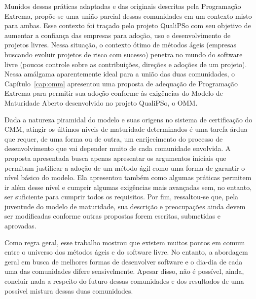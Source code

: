 Munidos dessas práticas adaptadas e das originais descritas pela
Programação Extrema, propõe-se uma união parcial dessas comunidades em
um contexto misto para ambas. Esse contexto foi traçado pelo projeto
QualiPSo com seu objetivo de aumentar a confiança das empresas para
adoção, uso e desenvolvimento de projetos livres.  Nessa situação, o
contexto ótimo de métodos ágeis (empresas buscando evoluir projetos de
risco com sucesso) penetra no mundo do software livre (poucos controle
sobre as contribuições, direções e adoções de um projeto). Nessa
amálgama aparentemente ideal para a união das duas comunidades, o
Capítulo~\ref{cap:omm} apresentou uma proposta de adequação de
Programação Extrema para permitir sua adoção conforme às exigências do
Modelo de Maturidade Aberto desenvolvido no projeto QualiPSo, o OMM.

Dada a natureza piramidal do modelo e suas origens no sistema de
certificação do CMM, atingir os últimos níveis de maturidade
determinados é uma tarefa árdua que requer, de uma forma ou de outra,
um enrijecimento do processo de desenvolvimento que vai depender muito
de cada comunidade envolvida. A proposta apresentada busca apenas
apresentar os argumentos iniciais que permitam justificar a adoção de
um método ágil como uma forma de garantir o nível básico do
modelo. Ela apresentou também como algumas práticas permitem ir além
desse nível e cumprir algumas exigências mais avançadas sem, no
entanto, ser suficiente para cumprir todos os requisitos. Por fim,
ressaltou-se que, pela juventude do modelo de maturidade, sua
descrição e preocupações ainda devem ser modificadas conforme outras
propostas forem escritas, submetidas e aprovadas.

Como regra geral, esse trabalho mostrou que existem muitos pontos em
comum entre o universo dos métodos ágeis e do software livre. No
entanto, a abordagem geral em busca de melhores formas de desenvolver
software e o dia-dia de cada uma das comunidades difere
sensivelmente. Apesar disso, não é possível, ainda, concluir nada a
respeito do futuro dessas comunidades e dos resultados de uma possível
mistura dessas duas comunidades.

